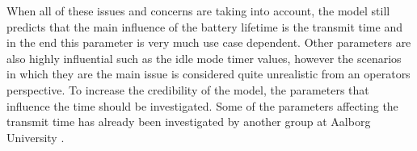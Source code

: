 When all of these issues and concerns are taking into account, the model still predicts that the main influence of the battery lifetime is the transmit time and in the end this parameter is very much use case dependent. Other parameters are also highly influential such as the idle mode timer values, however the scenarios in which they are the main issue is considered quite unrealistic from an operators perspective. To increase the credibility of the model, the parameters that influence the time should be investigated. Some of the parameters affecting the transmit time has already been investigated by another group at Aalborg University \citep{NDS_report}.



